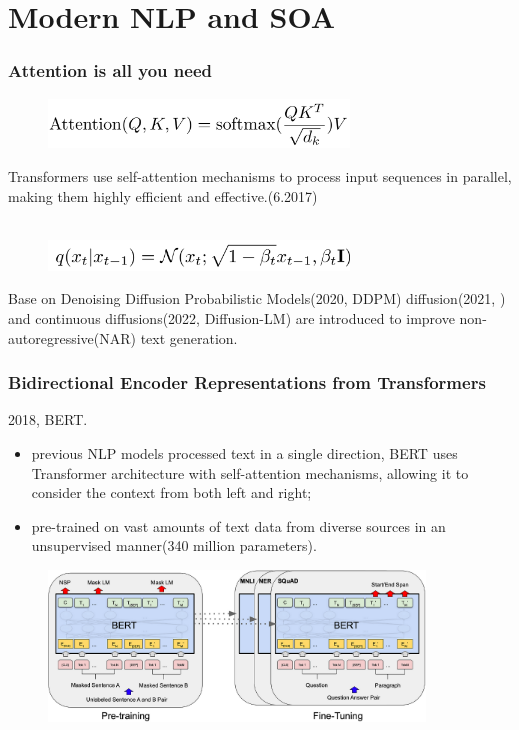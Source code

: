 \documentclass{beamer}
\begin{document}
\section{Modern NLP and SOA}
\begin{frame}
  \frametitle{Attention is all you need}
  \begin{figure}[H]
    \centering
    \includegraphics[width=8cm]{pictures/屏幕截图 2024-06-30 171741.png}
  \end{figure}
  Transformers use self-attention mechanisms to process input sequences in parallel, making them highly efficient and effective.(6.2017\cite{vaswani2023attentionneed})\\\
  \begin{figure}[H]
    \centering
    \includegraphics[width=8cm]{pictures/屏幕截图 2024-06-30 171707.png}
  \end{figure}

  Base on Denoising Diffusion Probabilistic Models(2020, DDPM\cite{ho2020denoisingdiffusionprobabilisticmodels})
  diffusion(2021, \cite{austin2023structureddenoisingdiffusionmodels}) and continuous diffusions(2022, Diffusion-LM\cite{li2022diffusionlmimprovescontrollabletext}) are introduced to improve non-autoregressive(NAR) text generation.

\end{frame}
\begin{frame}
  \frametitle{Bidirectional Encoder Representations from Transformers}
  2018, BERT\cite{devlin2019bertpretrainingdeepbidirectional}.
  \begin{itemize}
    \item previous NLP models processed
    text in a single direction, BERT uses Transformer architecture
    with self-attention mechanisms, allowing
    it to consider the context from both left
    and right;
    \item pre-trained on vast amounts of text data from diverse sources in an unsupervised
    manner(340 million parameters).
  \end{itemize}
  \begin{figure}[H]
    \centering
    \includegraphics[width=10cm]{pictures/微信图片_20240630203856.png}
  \end{figure}
\end{frame}
\end{document}
